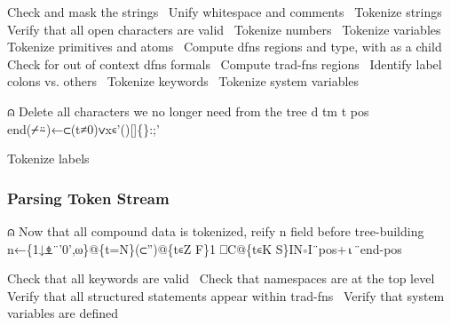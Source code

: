 \documentclass{article}%
\begin{document}
\LA{}Check and mask the strings~{\nwtagstyle{}}\RA{}
\LA{}Unify whitespace and comments~{\nwtagstyle{}}\RA{}
\LA{}Tokenize strings~{\nwtagstyle{}}\RA{}
\LA{}Verify that all open characters are valid~{\nwtagstyle{}}\RA{}
\LA{}Tokenize numbers~{\nwtagstyle{}}\RA{}
\LA{}Tokenize variables~{\nwtagstyle{}}\RA{}
\LA{}Tokenize primitives and atoms~{\nwtagstyle{}}\RA{}
\LA{}Compute dfns regions and type, with \code{}{\nwrbrace}\edoc{} as a child~{\nwtagstyle{}}\RA{}
\LA{}Check for out of context dfns formals~{\nwtagstyle{}}\RA{}
\LA{}Compute trad-fns regions~{\nwtagstyle{}}\RA{}
\LA{}Identify label colons vs. others~{\nwtagstyle{}}\RA{}
\LA{}Tokenize keywords~{\nwtagstyle{}}\RA{}
\LA{}Tokenize system variables~{\nwtagstyle{}}\RA{}

⍝ Delete all characters we no longer need from the tree
d tm t pos end(⌿⍨)←⊂(t≠0)∨x∊'()[]\{\}:;'

\LA{}Tokenize labels~{\nwtagstyle{}}\RA{}
\nwendcode{}\nwdocspar

\subsubsection{Parsing Token Stream}

\nwenddocs{}\endmoddef\nwstartdeflinemarkup{}\nwenddeflinemarkup
⍝ Now that all compound data is tokenized, reify n field before tree-building
n←\{1↓⍎¨'0',⍵\}@\{t=N\}(⊂'')@\{t∊Z F\}1 ⎕C@\{t∊K S\}IN∘I¨pos+⍳¨end-pos

\LA{}Check that all keywords are valid~{\nwtagstyle{}}\RA{}
\LA{}Check that namespaces are at the top level~{\nwtagstyle{}}\RA{}
\LA{}Verify that all structured statements appear within trad-fns~{\nwtagstyle{}}\RA{}
\LA{}Verify that system variables are defined~{\nwtagstyle{}}\RA{}
\end{document}
